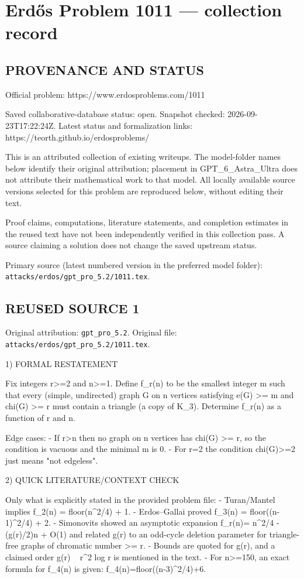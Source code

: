 \section*{Erd\H{o}s Problem 1011 --- collection record}

\subsection*{PROVENANCE AND STATUS}
Official problem: https://www.erdosproblems.com/1011

Saved collaborative-database status: open.
Snapshot checked: 2026-09-23T17:22:24Z.
Latest status and formalization links: https://teorth.github.io/erdosproblems/

This is an attributed collection of existing writeups. The model-folder names below identify their original attribution; placement in GPT\_6\_Astra\_Ultra does not attribute their mathematical work to that model. All locally available source versions selected for this problem are reproduced below, without editing their text.

Proof claims, computations, literature statements, and completion estimates in the reused text have not been independently verified in this collection pass. A source claiming a solution does not change the saved upstream status.

Primary source (latest numbered version in the preferred model folder): \texttt{attacks/erdos/gpt\_pro\_5.2/1011.tex}.

\subsection*{REUSED SOURCE 1}
Original attribution: \texttt{gpt\_pro\_5.2}.
Original file: \texttt{attacks/erdos/gpt\_pro\_5.2/1011.tex}.


1) FORMAL RESTATEMENT

Fix integers r>=2 and n>=1. Define f_r(n) to be the smallest integer m such that every (simple, undirected) graph G on n vertices satisfying
  e(G) >= m  and  chi(G) >= r
must contain a triangle (a copy of K_3).
Determine f_r(n) as a function of r and n.

Edge cases:
- If r>n then no graph on n vertices has chi(G) >= r, so the condition is vacuous and the minimal m is 0.
- For r=2 the condition chi(G)>=2 just means "not edgeless".

2) QUICK LITERATURE/CONTEXT CHECK

Only what is explicitly stated in the provided problem file:
- Turan/Mantel implies f_2(n) = floor(n^2/4) + 1.
- Erdos--Gallai proved f_3(n) = floor((n-1)^2/4) + 2.
- Simonovits showed an asymptotic expansion f_r(n)= n^2/4 - (g(r)/2)n + O(1) and related g(r) to an odd-cycle deletion parameter for triangle-free graphs of chromatic number >= r.
- Bounds are quoted for g(r), and a claimed order g(r) ~ r^2 log r is mentioned in the text.
- For n>=150, an exact formula for f_4(n) is given: f_4(n)=floor((n-3)^2/4)+6.

